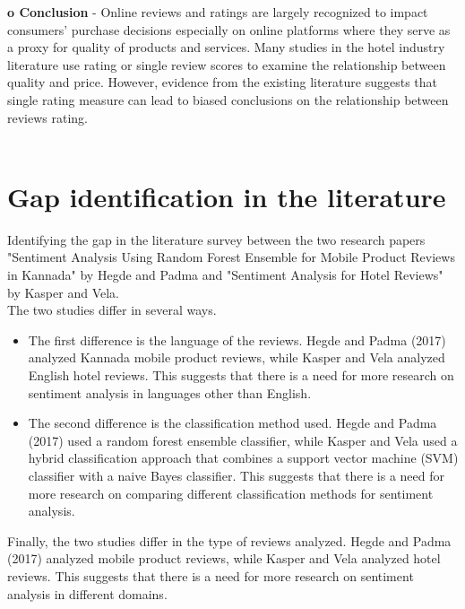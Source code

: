 \documentclass[a4paper, 12pt]{report}
\begin{document}
\textbf{o	Conclusion} - Online reviews and ratings are largely recognized to impact consumers' purchase decisions especially on online platforms where they serve as a proxy for quality of products and services. Many studies in the hotel industry literature use rating or single review scores to examine the relationship between quality and price. However, evidence from the existing literature suggests that single rating measure can lead to biased conclusions on the relationship between reviews rating.
\\
\\
\section{Gap identification in the literature}
Identifying the gap in the literature survey between the two research papers "Sentiment Analysis Using Random Forest Ensemble for Mobile Product Reviews in Kannada" by Hegde and Padma and "Sentiment Analysis for Hotel Reviews" by Kasper and Vela.\\
The two studies differ in several ways.
\begin{itemize}
	\item The first difference is the language of the reviews. Hegde and Padma (2017) analyzed Kannada mobile product reviews, while Kasper and Vela analyzed English hotel reviews. This suggests that there is a need for more research on sentiment analysis in languages other than English.
	\item The second difference is the classification method used. Hegde and Padma (2017) used a random forest ensemble classifier, while Kasper and Vela used a hybrid classification approach that combines a support vector machine (SVM) classifier with a naive Bayes classifier. This suggests that there is a need for more research on comparing different classification methods for sentiment analysis.
\end{itemize}
Finally, the two studies differ in the type of reviews analyzed. Hegde and Padma (2017) analyzed mobile product reviews, while Kasper and Vela analyzed hotel reviews. This suggests that there is a need for more research on sentiment analysis in different domains.
\end{document}
